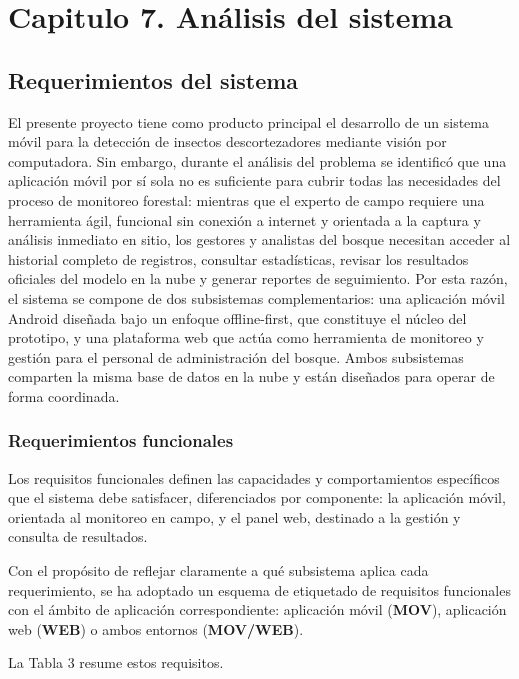 \newpage
\section*{Capitulo 7. Análisis del sistema}
\setcounter{section}{7}
\setcounter{subsection}{0}

\subsection{Requerimientos del sistema}
El presente proyecto tiene como producto principal el desarrollo de un sistema móvil para la detección de insectos descortezadores mediante visión por computadora. Sin embargo, durante el análisis del problema se identificó que una aplicación móvil por sí sola no es suficiente para cubrir todas las necesidades del proceso de monitoreo forestal: mientras que el experto de campo requiere una herramienta ágil, funcional sin conexión a internet y orientada a la captura y análisis inmediato en sitio, los gestores y analistas del bosque necesitan acceder al historial completo de registros, consultar estadísticas, revisar los resultados oficiales del modelo en la nube y generar reportes de seguimiento.
Por esta razón, el sistema se compone de dos subsistemas complementarios: una aplicación móvil Android diseñada bajo un enfoque offline-first, que constituye el núcleo del prototipo, y una plataforma web que actúa como herramienta de monitoreo y gestión para el personal de administración del bosque. Ambos subsistemas comparten la misma base de datos en la nube y están diseñados para operar de forma coordinada.

\subsubsection{Requerimientos funcionales}
Los requisitos funcionales definen las capacidades y comportamientos específicos que el sistema debe satisfacer, diferenciados por componente: la aplicación móvil, orientada al monitoreo en campo, y el panel web, destinado a la gestión y consulta de resultados. 

Con el propósito de reflejar claramente a qué subsistema aplica cada requerimiento, se ha adoptado un esquema de etiquetado de requisitos funcionales con el ámbito de aplicación correspondiente: aplicación móvil (\textbf{MOV}), aplicación web (\textbf{WEB}) o ambos entornos (\textbf{MOV/WEB}).

La Tabla 3 resume estos requisitos.

